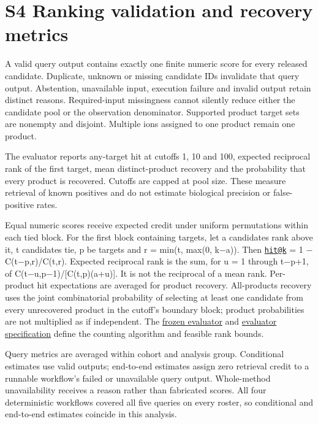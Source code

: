 \documentclass[
  10pt,
  a4paper,
]{article}
\begin{document}
\section{S4 Ranking validation and recovery metrics}\label{s4-ranking-validation-and-recovery-metrics}

A valid query output contains exactly one finite numeric score for every released candidate. Duplicate, unknown or missing candidate IDs invalidate that query output. Abstention, unavailable input, execution failure and invalid output retain distinct reasons. Required-input missingness cannot silently reduce either the candidate pool or the observation denominator. Supported product target sets are nonempty and disjoint. Multiple ions assigned to one product remain one product.

The evaluator reports any-target hit at cutoffs 1, 10 and 100, expected reciprocal rank of the first target, mean distinct-product recovery and the probability that every product is recovered. Cutoffs are capped at pool size. These measure retrieval of known positives and do not estimate biological precision or false-positive rates.

Equal numeric scores receive expected credit under uniform permutations within each tied block. For the first block containing targets, let a candidates rank above it, t candidates tie, p be targets and r = min(t, max(0, k−a)). Then \href{mailto:hit@k}{\nolinkurl{hit@k}} = 1 − C(t−p,r)/C(t,r). Expected reciprocal rank is the sum, for u = 1 through t−p+1, of C(t−u,p−1)/{[}C(t,p)(a+u){]}. It is not the reciprocal of a mean rank. Per-product hit expectations are averaged for product recovery. All-products recovery uses the joint combinatorial probability of selecting at least one candidate from every unrecovered product in the cutoff's boundary block; product probabilities are not multiplied as if independent. The \href{https://github.com/vinvomero/fungallink-benchmark/blob/main/data/processed/source-selected-gcf-analysis-v1/snapshots/scripts/evaluate_rankings.py}{frozen evaluator} and \href{https://github.com/vinvomero/fungallink-benchmark/blob/main/docs/evaluation/ranking-evaluator.md}{evaluator specification} define the counting algorithm and feasible rank bounds.

Query metrics are averaged within cohort and analysis group. Conditional estimates use valid outputs; end-to-end estimates assign zero retrieval credit to a runnable workflow's failed or unavailable query output. Whole-method unavailability receives a reason rather than fabricated scores. All four deterministic workflows covered all five queries on every roster, so conditional and end-to-end estimates coincide in this analysis.
\end{document}
